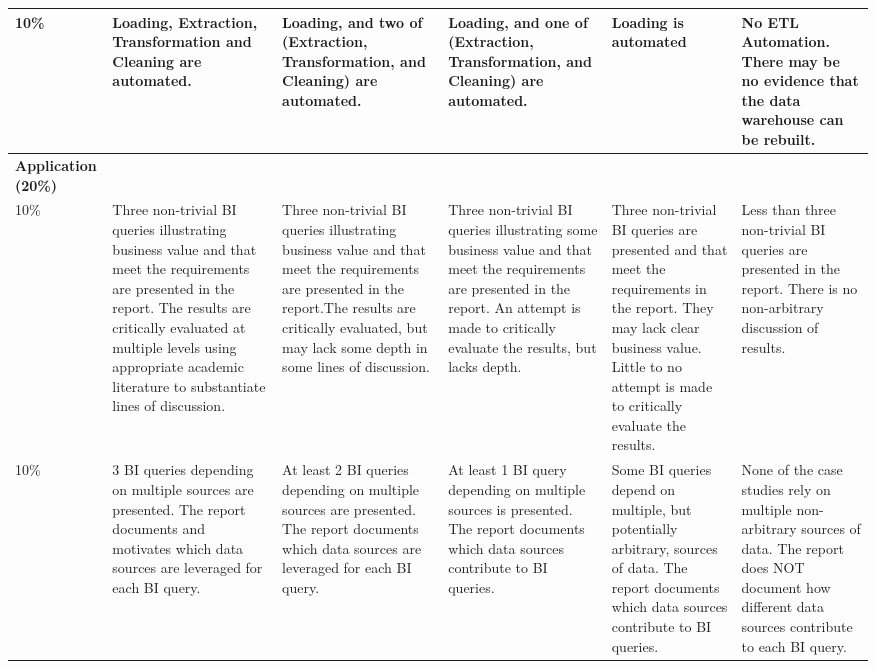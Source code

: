 \documentclass{article}[a4paper,12pt]
\begin{document}
\begin{landscape}
\begin{center}
\begin{longtable}{|p{.15\linewidth}||*5{p{.15\linewidth}|}}
	10\%
 	& Loading, Extraction, Transformation and Cleaning are automated.
 	& Loading, and two of (Extraction, Transformation, and Cleaning) are automated.
 	& Loading, and one of (Extraction, Transformation, and Cleaning) are automated.
 	& Loading is automated
 	& No ETL Automation. There may be no evidence that the data warehouse can be rebuilt. \\\hline
	
	\textbf{Application (20\%)} & & & & & \\
	10\%	
	& Three non-trivial BI queries illustrating business value and that meet the requirements are presented in the report. The results are critically evaluated at multiple levels using appropriate academic literature to substantiate lines of discussion.
	& Three non-trivial BI queries illustrating business value and that meet the requirements are presented in the report.The results are critically evaluated, but may lack some depth in some lines of discussion.
	& Three non-trivial BI queries illustrating some business value and that meet the requirements are presented in the report. An attempt is made to critically evaluate the results, but lacks depth.
	& Three non-trivial BI queries are presented and that meet the requirements in the report. They may lack clear business value. Little to no attempt is made to critically evaluate the results.
	& Less than three non-trivial BI queries are presented in the report. There is no non-arbitrary discussion of results.
\\\cline{2-6}	

	10\%
 	& 3 BI queries depending on multiple sources are presented. The report documents and motivates which data sources are leveraged for each BI query.
 	& At least 2 BI queries depending on multiple sources are presented. The report documents which data sources are leveraged for each BI query.
 	& At least 1 BI query depending on multiple sources is presented. The report documents which data sources contribute to BI queries.
 	& Some BI queries depend on multiple, but potentially arbitrary, sources of data. The report documents which data sources contribute to BI queries.
 	& None of the case studies rely on multiple non-arbitrary sources of data. The report does NOT document how different data sources contribute to each BI query.  \\\hline
	

\end{longtable}
\end{center}
\end{landscape}
\end{document}
